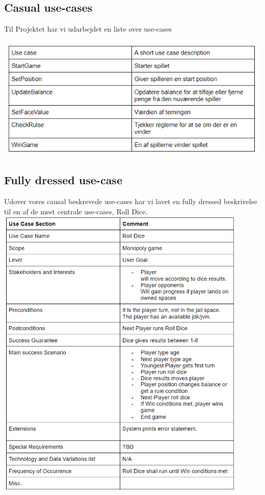 \begin{flushleft}
\subsection{Casual use-cases}
\doublespacing


Til Projektet har vi udarbejdet en liste over use-cases

\includegraphics[width=1\textwidth]{Report/figures/Use case.PNG}
\newpage
\subsection{Fully dressed use-case}
Udover vores causal beskrevede use-cases har vi lavet en fully dressed beskrivelse til en af de mest centrale use-cases, Roll Dice.
\addlinespace
\includegraphics[width=0.9\textwidth]{Report/figures/Fullyusecase.png}


\end{flushleft}
